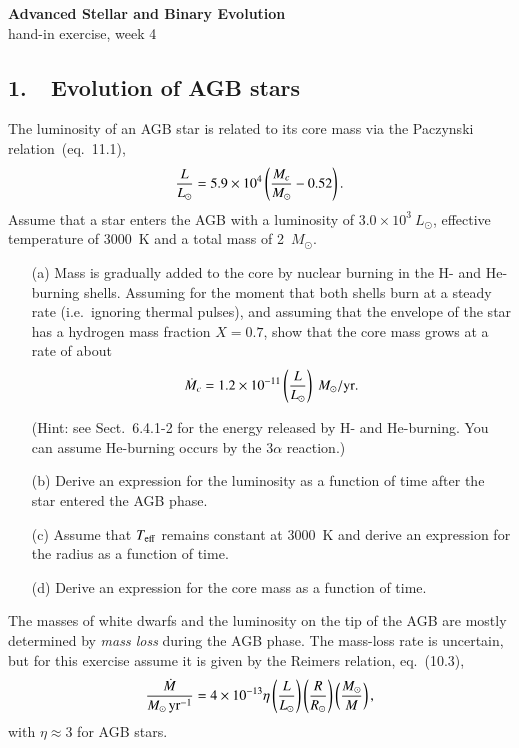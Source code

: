 \documentclass[a4paper,11pt]{article}
\newcommand{\Msun}{\ensuremath{{M}_\odot}}
\newcommand{\Rsun}{\ensuremath{{R}_\odot}}
\newcommand{\Lsun}{\ensuremath{{L}_\odot}}
\begin{document}
\begin{center}
{\Large\bf Advanced Stellar and Binary Evolution} \\ [1ex]
{\large hand-in exercise, week 4}

\end{center}

\subsection*{1.~~Evolution of AGB stars}
\label{ex:AGB-evol}

The luminosity of an AGB star is related to its core mass via the
Paczynski relation~(eq.~11.1),
\[
    {L\over\Lsun}=5.9\times 10^4 \left({M_c\over\Msun} - 0.52\right).
\]
Assume that a star enters the AGB with a luminosity of $3.0\times10^3~\Lsun$, effective temperature of 3000~K and a total mass of 2~$\Msun$.
    
\begin{enumerate}

\item[(a)] Mass is gradually added to the core by nuclear burning in the H- and He-burning shells. Assuming for the moment that both shells burn at a steady rate (i.e.\ ignoring thermal pulses), and assuming that the envelope of the star has a hydrogen mass fraction $X=0.7$, show that the core mass grows at a rate of about 
\[ \dot M_c = 1.2\times 10^{-11} \left(L\over\Lsun\right)~\Msun/\mathrm{yr}. \]

(Hint: see Sect.~6.4.1-2 for the energy released by H- and He-burning. You can assume He-burning occurs by the $3\alpha$ reaction.)


\item[(b)] Derive an expression for the luminosity as a function of time
  after the star entered the AGB phase.
    
\item[(c)] Assume that $T_{\rm eff}$ remains constant at 3000~K and derive an
  expression for the radius as a function of time.
    
\item[(d)] Derive an expression for the core mass as a function of time.
    
\end{enumerate}
    
\noindent
The masses of white dwarfs and the luminosity on the tip of the AGB
are mostly determined by \emph{mass loss} during the AGB phase. The mass-loss 
rate is uncertain, but for this exercise assume it is given by the Reimers
relation, eq.~(10.3),
\[
      {\dot M\over\Msun\,\mathrm{yr}^{-1}}= 4\times 10^{-13}\eta
      \left({L\over\Lsun}\right)
      \left({R\over\Rsun}\right)\left({\Msun\over M}\right),      
\]
with $\eta\approx3$ for AGB stars. 
      
\end{document}
